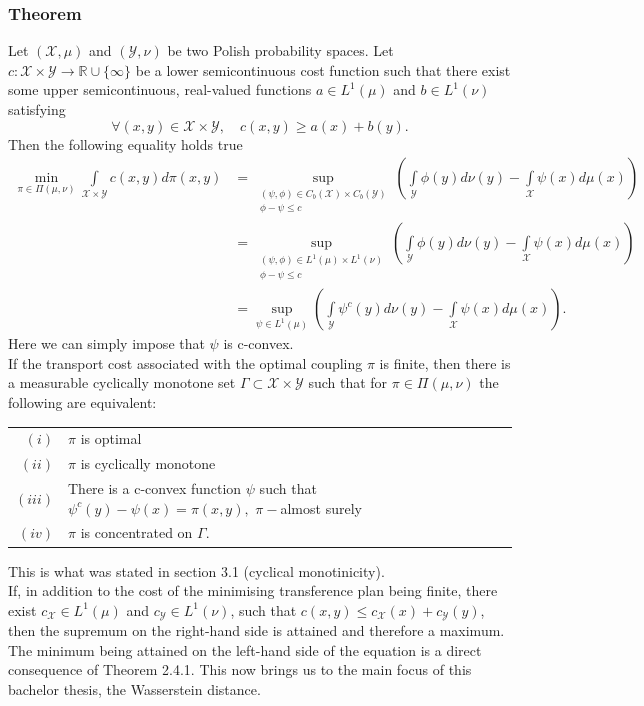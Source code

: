 \documentclass[11pt,a4paper]{article}
\begin{document}
\subsubsection{Theorem}
Let $(\mathcal{X},\mu)$ and $(\mathcal{Y},\nu)$ be two Polish probability spaces. Let $c:\mathcal{X\times{}Y}\rightarrow\mathbb{R}\cup\lbrace\infty\rbrace$ be a lower semicontinuous cost function such that there exist some upper semicontinuous, real-valued functions $a\in{}L^1(\mu)$ and $b\in{}L^1(\nu)$ satisfying
\[
\forall (x,y)\in\mathcal{X\times{}Y},\quad{}c(x,y)\geq{}a(x)+b(y).
\]
Then the following equality holds true
\begin{align*}
\min_{\pi\in\Pi(\mu,\nu)}\int\limits_{\mathcal{X\times{}Y}} c(x,y)d\pi(x,y) & = \sup_{\substack{(\psi,\phi)\in{}C_b(\mathcal{X})\times{}C_b(\mathcal{Y}) \\ \phi-\psi\leq{}c}} \left(\int\limits_{\mathcal{Y}} \phi(y)d\nu(y) - \int\limits_{\mathcal{X}}\psi(x)d\mu(x)\right) \\ & =\sup_{\substack{(\psi,\phi)\in{}L^1(\mu)\times{}L^1(\nu) \\ \phi-\psi\leq{}c}} \left(\int\limits_{\mathcal{Y}} \phi(y)d\nu(y) - \int\limits_{\mathcal{X}}\psi(x)d\mu(x)\right)   \\ &=\sup_{\psi\in{}L^1(\mu)}\left(\int\limits_{\mathcal{Y}} \psi^c(y)d\nu(y) - \int\limits_{\mathcal{X}}\psi(x)d\mu(x)\right).
\end{align*}
Here we can simply impose that $\psi$ is c-convex.\vspace{1em}\\
If the transport cost associated with the optimal coupling $\pi$ is finite, then there is a measurable cyclically monotone set $\Gamma\subset\mathcal{X\times{}Y}$ such that for $\pi\in\Pi(\mu,\nu)$ the following are equivalent:
\begin{center}\begin{tabular}{rl}
$(i)$& $\pi$ is optimal\\
$(ii)$& $\pi$ is cyclically monotone\\
$(iii)$& There is a c-convex function $\psi$ such that $\psi^c(y)-\psi(x)=\pi(x,y),\,\, \pi-$almost surely\\
$(iv)$& $\pi$ is concentrated on $\Gamma.$
\end{tabular}
\end{center} 
This is what was stated in section 3.1 (cyclical monotinicity).\vspace{1em}\\
If, in addition to the cost of the minimising transference plan being finite, there exist $c_{\mathcal{X}}\in{}L^1(\mu)$ and $c_{\mathcal{Y}}\in{}L^1(\nu)$, such that $c(x,y)\leq{}c_{\mathcal{X}}(x)+c_{\mathcal{Y}}(y)$, then the supremum on the right-hand side is attained and therefore a maximum. The minimum being attained on the left-hand side of the equation is a direct consequence of Theorem 2.4.1. This now brings us to the main focus of this bachelor thesis, the Wasserstein distance.
\end{document}
